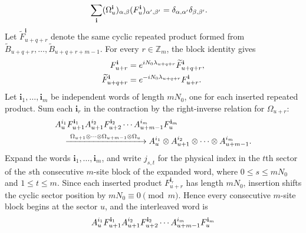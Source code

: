 \begin{lemma}
\begin{align}
        \sum_{\mathbf i}(\Omega_u^{\mathbf i})_{\alpha,\beta}
        (F_u^{\mathbf i})_{\alpha',\beta'}
         & =
        \delta_{\alpha,\alpha'}\delta_{\beta,\beta'}.
        \notag
    \end{align}
    Let $\widetilde F_{u+q+r}^{\mathbf i}$ denote the same cyclic repeated
    product formed from
    $\widetilde B_{u+q+r},\ldots,\widetilde B_{u+q+r+m-1}$. For every
    $r\in\mathbb Z_m$, the block identity gives
    \begin{align}
        F_{u+r}^{\mathbf i}
         & =
        e^{iN_0\lambda_{u+q+r}}\widetilde F_{u+q+r}^{\mathbf i},
        \notag \\
        \widetilde F_{u+q+r}^{\mathbf i}
         & =
        e^{-iN_0\lambda_{u+q+r}}F_{u+r}^{\mathbf i}.
        \notag
    \end{align}
    Let $\mathbf i_1,\ldots,\mathbf i_m$ be independent words of length $mN_0$,
    one for each inserted repeated product. Sum each $\mathbf i_r$ in the
    contraction by the right-inverse relation for $\Omega_{u+r}$:
    \begin{align}
         & A_u^{i_1}F_{u+1}^{\mathbf i_1}
        A_{u+1}^{i_2}F_{u+2}^{\mathbf i_2}
        \cdots
        A_{u+m-1}^{i_m}F_u^{\mathbf i_m}
        \notag                                                                \\
         & \quad\xrightarrow{\ \Omega_{u+1}\otimes\cdots\otimes\Omega_{u+m-1}
            \otimes\Omega_u\ }
        A_u^{i_1}\otimes A_{u+1}^{i_2}\otimes\cdots\otimes A_{u+m-1}^{i_m}.
        \notag
    \end{align}
    Expand the words $\mathbf i_1,\ldots,\mathbf i_m$, and write $j_{s,t}$ for
    the physical index in the $t$th sector of the $s$th consecutive $m$-site
    block of the expanded word, where $0\leq s\leq mN_0$ and $1\leq t\leq m$.
    Since each inserted product $F_{u+r}^{\mathbf i_r}$ has length $mN_0$,
    insertion shifts the cyclic sector position by $mN_0\equiv 0\pmod m$.
    Hence every consecutive $m$-site block begins at the sector $u$, and the
    interleaved word is
    \begin{align}
         & A_u^{i_1}F_{u+1}^{\mathbf i_1}
        A_{u+1}^{i_2}F_{u+2}^{\mathbf i_2}
        \cdots
        A_{u+m-1}^{i_m}F_u^{\mathbf i_m}
        \notag                            \\

\end{align}
\end{lemma}
